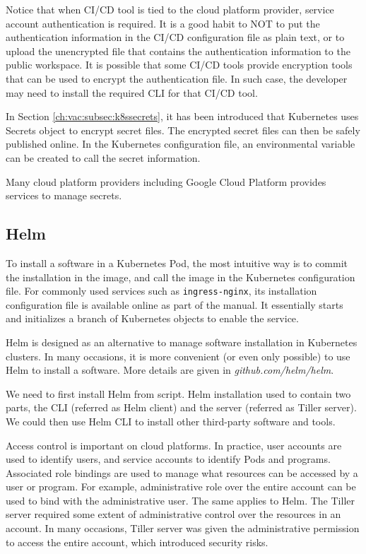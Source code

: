 Notice that when CI/CD tool is tied to the cloud platform provider, service account authentication is required. It is a good habit to NOT to put the authentication information in the CI/CD configuration file as plain text, or to upload the unencrypted file that contains the authentication information to the public workspace. It is possible that some CI/CD tools provide encryption tools that can be used to encrypt the authentication file. In such case, the developer may need to install the required CLI for that CI/CD tool.

In Section \ref{ch:vac:subsec:k8ssecrets}, it has been introduced that Kubernetes uses Secrets object to encrypt secret files. The encrypted secret files can then be safely published online. In the Kubernetes configuration file, an environmental variable can be created to call the secret information.

Many cloud platform providers including Google Cloud Platform provides services to manage secrets.

\subsection{Helm}

To install a software in a Kubernetes Pod, the most intuitive way is to commit the installation in the image, and call the image in the Kubernetes configuration file. For commonly used services such as \verb|ingress-nginx|, its installation configuration file is available online as part of the manual. It essentially starts and initializes a branch of Kubernetes objects to enable the service.

Helm is designed as an alternative to manage software installation in Kubernetes clusters. In many occasions, it is more convenient (or even only possible) to use Helm to install a software. More details are given in \textit{github.com/helm/helm}.

We need to first install Helm from script. Helm installation used to contain two parts, the CLI (referred as Helm client) and the server (referred as Tiller server). We could then use Helm CLI to install other third-party software and tools.

Access control is important on cloud platforms. In practice, user accounts are used to identify users, and service accounts to identify Pods and programs. Associated role bindings are used to manage what resources can be accessed by a user or program. For example, administrative role over the entire account can be used to bind with the administrative user. The same applies to Helm. The Tiller server required some extent of administrative control over the resources in an account. In many occasions, Tiller server was given the administrative permission to access the entire account, which introduced security risks.

